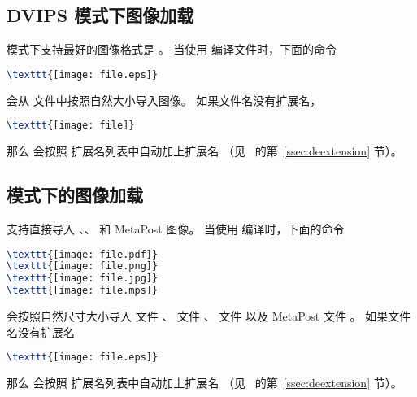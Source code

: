 \subsection{DVIPS 模式下图像加载}
 模式下支持最好的图像格式是 。
当使用  编译文件时，下面的命令
\begin{lstlisting}[language=LaTeX]
\texttt{[image: file.eps]}
\end{lstlisting}
会从  文件中按照自然大小导入图像。
如果文件名没有扩展名，
\begin{lstlisting}[language=LaTeX]
\texttt{[image: file]}
\end{lstlisting}
那么  会按照  扩展名列表中自动加上扩展名
（见~\pageref{ssec:deextension} 的第~\ref{ssec:deextension} 节）。

\subsection[pdfLaTeX 模式下的图像加载]{\pdfLaTeX{} 模式下的图像加载}
\pdfTeX{} 支持直接导入 、、 和 MetaPost 图像。
当使用  编译时，下面的命令
\begin{lstlisting}[language=LaTeX]
\texttt{[image: file.pdf]}
\texttt{[image: file.png]}
\texttt{[image: file.jpg]}
\texttt{[image: file.mps]}
\end{lstlisting}
会按照自然尺寸大小导入  文件 、
 文件 、
 文件 
以及 MetaPost 文件 。
如果文件名没有扩展名
\begin{lstlisting}[language=LaTeX]
\texttt{[image: file.eps]}
\end{lstlisting}
那么  会按照  扩展名列表中自动加上扩展名
（见~\pageref{ssec:deextension} 的第~\ref{ssec:deextension} 节）。

